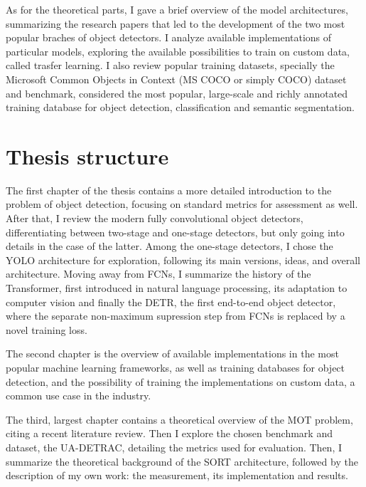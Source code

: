 As for the theoretical parts, I gave a brief overview of the model architectures, summarizing the research papers that led to the development of the two most popular braches of object detectors. I analyze available implementations of particular models, exploring the available possibilities to train on custom data, called trasfer learning. I also review popular training datasets, specially the Microsoft Common Objects in Context (MS COCO or simply COCO) dataset and benchmark, considered the most popular, large-scale and richly annotated training database for object detection, classification and semantic segmentation.

\section*{Thesis structure}

The first chapter of the thesis contains a more detailed introduction to the problem of object detection, focusing on standard metrics for assessment as well. After that, I review the modern fully convolutional object detectors, differentiating between two-stage and one-stage detectors, but only going into details in the case of the latter. Among the one-stage detectors, I chose the YOLO architecture for exploration, following its main versions, ideas, and overall architecture. Moving away from FCNs, I summarize the history of the Transformer, first introduced in natural language processing, its adaptation to computer vision and finally the DETR, the first end-to-end object detector, where the separate non-maximum supression step from FCNs is replaced by a novel training loss.

The second chapter is the overview of available implementations in the most popular machine learning frameworks, as well as training databases for object detection, and the possibility of training the implementations on custom data, a common use case in the industry.

The third, largest chapter contains a theoretical overview of the MOT problem, citing a recent literature review. Then I explore the chosen benchmark and dataset, the UA-DETRAC, detailing the metrics used for evaluation. Then, I summarize the theoretical background of the SORT architecture, followed by the description of my own work: the measurement, its implementation and results.